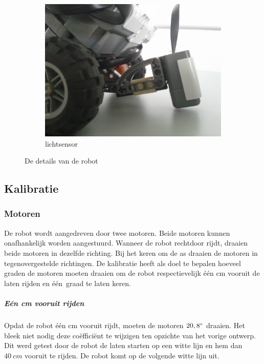 \documentclass[eind]{penoverslag}
\begin{document}
\begin{figure}
\begin{subfigure}[h]{0.325\textwidth}
		\includegraphics[width=\textwidth]{lichtsensorDown}
		\caption{lichtsensor}
	\end{subfigure}
\caption{De details van de robot}
\label{fig:robotDetail}
\end{figure}

\subsection{Kalibratie}
\label{ssec:Kalib}

\subsubsection{Motoren}
De robot wordt aangedreven door twee motoren. Beide motoren kunnen onafhankelijk worden aangestuurd. Wanneer de robot rechtdoor rijdt, draaien beide motoren in dezelfde richting. Bij het keren om de as draaien de motoren in tegenovergestelde richtingen. De kalibratie heeft als doel te bepalen hoeveel graden de motoren moeten draaien om de robot respectievelijk \'e\'en cm vooruit de laten rijden en \'e\'en~graad te laten keren.

\subparagraph{E\'en cm vooruit rijden}
Opdat de robot \'e\'en cm vooruit rijdt, moeten de motoren $20,8\degree$ draaien. Het bleek niet nodig deze co\"effici\"ent te wijzigen ten opzichte van het vorige ontwerp. Dit werd getest door de robot de laten starten op een witte lijn en hem dan $40~cm$ vooruit te rijden. De robot komt op de volgende witte lijn uit.
\end{document}
